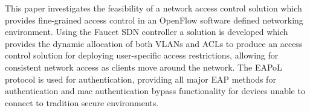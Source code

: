 This paper investigates the feasibility of a network access control solution which provides fine-grained access control in an OpenFlow software defined networking environment. Using the Faucet SDN controller a solution is developed which provides the dynamic allocation of both VLANs and ACLs to produce an access control solution for deploying user-specific access restrictions, allowing for consistent network access as clients move around the network. The EAPoL protocol is used for authentication, providing all major EAP methods for authentication and mac authentication bypass functionality for devices unable to connect to tradition secure environments.